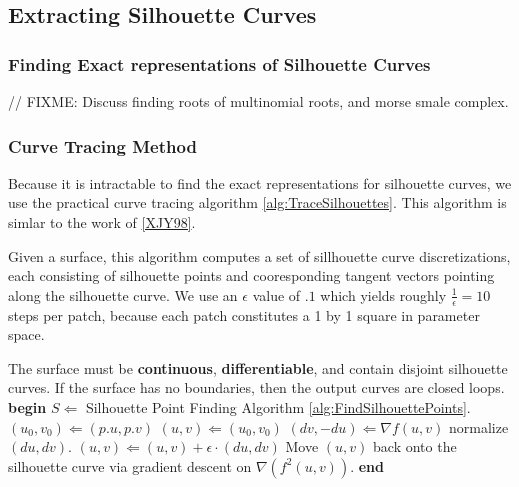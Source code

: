 \documentclass[12pt, letterpaper]{article}
\begin{document}
	\subsection{Extracting Silhouette Curves}

		\subsubsection{Finding Exact representations of Silhouette Curves}
			// FIXME: Discuss finding roots of multinomial roots, and morse smale complex.
	
		\subsubsection{Curve Tracing Method}

			Because it is intractable to find the exact representations for silhouette curves, we use the practical curve tracing algorithm \ref{alg:TraceSilhouettes}.
			This algorithm is simlar to the work of \ref{XJY98}.

			\begin{algorithm}                      %
			\caption{Given a surface, this algorithm computes a set of sillhouette curve discretizations,
				each consisting of silhouette points and cooresponding tangent vectors pointing along the silhouette curve.
				We use an $\epsilon$ value of $.1$ which yields roughly $\frac{1}{\epsilon} = 10$ steps per patch, because each patch constitutes a 1 by 1 square in parameter space.} %
			\label{alg:TraceSilhouettes}       %
			\begin{algorithmic}                    %
			    \REQUIRE The surface must be \textbf{continuous}, \textbf{differentiable}, and contain disjoint silhouette curves.
			    \ENSURE  If the surface has no boundaries, then the output curves are closed loops.
				\STATE \textbf{begin}
			    \STATE $S \Leftarrow $ Silhouette Point Finding Algorithm \ref{alg:FindSilhouettePoints}.
			        \STATE $(u_{0}, v_{0}) \Leftarrow (p.u, p.v)$
				\STATE $(u, v) \Leftarrow (u_{0}, v_{0})$
				\REPEAT
				        \STATE $(dv, -du) \Leftarrow \nabla f(u,v)$
					\STATE normalize $(du, dv)$.
					\STATE $(u, v) \Leftarrow (u, v) + \epsilon \cdot (du, dv)$
					\STATE Move $(u, v)$ back onto the silhouette curve via gradient descent on $\nabla(f^{2}(u,v))$.
			   \ENDFOR
				\STATE \textbf{end}
			\end{algorithmic}
			\end{algorithm}
\end{document}
